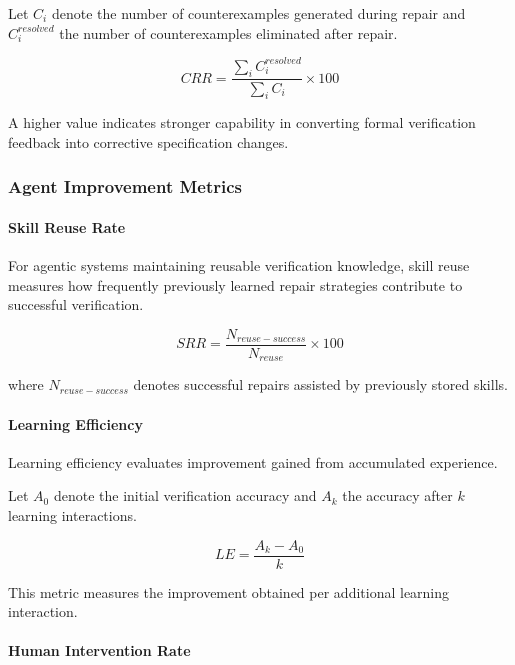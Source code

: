 Let $C_i$ denote the number of counterexamples generated during repair and
$C_i^{resolved}$ the number of counterexamples eliminated after repair.

\begin{equation}
CRR =
\frac{\sum_i C_i^{resolved}}
{\sum_i C_i}
\times 100
\end{equation}

A higher value indicates stronger capability in converting formal verification
feedback into corrective specification changes.

\subsubsection{Agent Improvement Metrics}

\paragraph{Skill Reuse Rate}

For agentic systems maintaining reusable verification knowledge, skill reuse
measures how frequently previously learned repair strategies contribute to
successful verification.

\begin{equation}
SRR =
\frac{N_{reuse-success}}
{N_{reuse}}
\times 100
\end{equation}

where $N_{reuse-success}$ denotes successful repairs assisted by previously stored
skills.

\paragraph{Learning Efficiency}

Learning efficiency evaluates improvement gained from accumulated experience.

Let $A_0$ denote the initial verification accuracy and $A_k$ the accuracy after
$k$ learning interactions.

\begin{equation}
LE =
\frac{A_k-A_0}{k}
\end{equation}

This metric measures the improvement obtained per additional learning interaction.

\paragraph{Human Intervention Rate}

